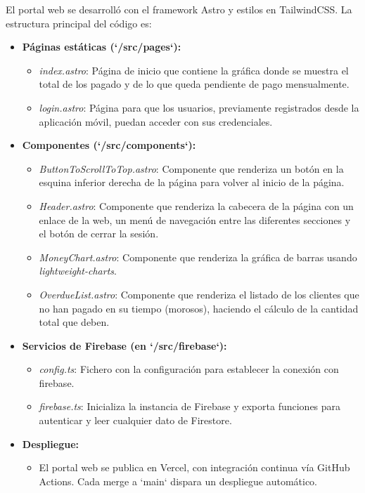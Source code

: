 \begin{large}

El portal web se desarrolló con el framework Astro y estilos en TailwindCSS. La estructura principal del código es:
\begin{itemize}
  \item \textbf{Páginas estáticas (`/src/pages`):}  
    \begin{itemize}
      \item \textit{index.astro}: Página de inicio que contiene la gráfica donde se muestra el total de los pagado y de lo que queda pendiente de pago mensualmente.
      \item \textit{login.astro}: Página para que los usuarios, previamente registrados desde la aplicación móvil, puedan acceder con sus credenciales.
    \end{itemize}
  \item \textbf{Componentes (`/src/components`):}  
    \begin{itemize}
      \item \textit{ButtonToScrollToTop.astro}: Componente que renderiza un botón en la esquina inferior derecha de la página para volver al inicio de la página.
      \item \textit{Header.astro}: Componente que renderiza la cabecera de la página con un enlace de la web, un menú de navegación entre las diferentes secciones y el botón de cerrar la sesión.
      \item \textit{MoneyChart.astro}: Componente que renderiza la gráfica de barras usando \textit{lightweight-charts}.
      \item \textit{OverdueList.astro}: Componente que renderiza el listado de los clientes que no han pagado en su tiempo (morosos), haciendo el cálculo de la cantidad total que deben.
    \end{itemize}
  \item \textbf{Servicios de Firebase (en `/src/firebase`):}  
    \begin{itemize}
      \item \textit{config.ts}: Fichero con la configuración para establecer la conexión con firebase.
      \item \textit{firebase.ts}: Inicializa la instancia de Firebase y exporta funciones para autenticar y leer cualquier dato de Firestore.
    \end{itemize}
  \item \textbf{Despliegue:}  
    \begin{itemize}
      \item El portal web se publica en Vercel, con integración continua vía GitHub Actions. Cada merge a `main` dispara un despliegue automático.
    \end{itemize}
\end{itemize}

\end{large}

